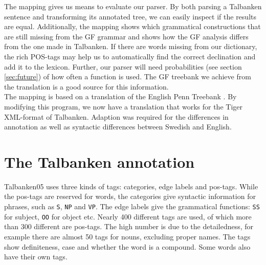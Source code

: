 \documentclass{report}
\begin{document}
The mapping %
gives us means to evaluate our parser. By both parsing a Talbanken sentence and
transforming its annotated tree, we can easily inspect if the results are
equal.
Additionally, the mapping shows which grammatical constructions that are still missing
from the GF grammar and shows how the GF analysis differs from the one made
in Talbanken.
If there are words missing from our dictionary, the rich
POS-tags may help us to automatically find the correct declination and add it to the
lexicon. Further, our parser will need probabilities (see section
\ref{sec:future}) of how often a function is used. The GF treebank we
achieve from the translation is a good source for this information.\\

The mapping is based on 
a translation of the English Penn Treebank \cite{gfpenn}.
By modifying this program, we now have a translation that works for
the Tiger XML-format of
Talbanken. Adaption was required for the differences in annotation as well as 
syntactic differences between Swedish and English.

\section{The Talbanken annotation}
Talbanken05 uses three kinds of tags: categories, edge labels and pos-tags. 
While the pos-tags are reserved for words, the categories give syntactic information
for phrases, such as \verb|S|, \verb|NP| and \verb|VP|.
The edge labels give the grammatical functions: \verb|SS| for subject, 
\verb|OO| for object etc. Nearly 400 different tags are used, of which more than
300 different are pos-tags. The high number is due to the detailedness, for
example there are almost 50 tags for nouns, excluding proper names. The tags
show definiteness, case and whether the word is a compound. Some words also have
their own tags.\\
\end{document}
